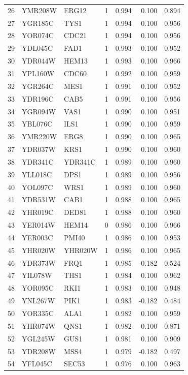 \begin{longtable}{rllrrrr}
26 & YMR208W & ERG12 & 1 & 0.994 & 0.100 & 0.894\\
27 & YGR185C & TYS1 & 1 & 0.994 & 0.100 & 0.956\\
28 & YOR074C & CDC21 & 1 & 0.994 & 0.100 & 0.956\\
29 & YDL045C & FAD1 & 1 & 0.993 & 0.100 & 0.952\\
30 & YDR044W & HEM13 & 1 & 0.993 & 0.100 & 0.966\\
31 & YPL160W & CDC60 & 1 & 0.992 & 0.100 & 0.959\\
32 & YGR264C & MES1 & 1 & 0.991 & 0.100 & 0.952\\
33 & YDR196C & CAB5 & 1 & 0.991 & 0.100 & 0.956\\
34 & YGR094W & VAS1 & 1 & 0.990 & 0.100 & 0.951\\
35 & YBL076C & ILS1 & 1 & 0.990 & 0.100 & 0.959\\
36 & YMR220W & ERG8 & 1 & 0.990 & 0.100 & 0.965\\
37 & YDR037W & KRS1 & 1 & 0.990 & 0.100 & 0.960\\
38 & YDR341C & YDR341C & 1 & 0.989 & 0.100 & 0.960\\
39 & YLL018C & DPS1 & 1 & 0.989 & 0.100 & 0.956\\
40 & YOL097C & WRS1 & 1 & 0.989 & 0.100 & 0.960\\
41 & YDR531W & CAB1 & 1 & 0.988 & 0.100 & 0.965\\
42 & YHR019C & DED81 & 1 & 0.988 & 0.100 & 0.960\\
43 & YER014W & HEM14 & 0 & 0.986 & 0.100 & 0.966\\
44 & YER003C & PMI40 & 1 & 0.986 & 0.100 & 0.953\\
45 & YHR020W & YHR020W & 1 & 0.986 & 0.100 & 0.965\\
46 & YDR373W & FRQ1 & 1 & 0.985 & -0.182 & 0.524\\
47 & YIL078W & THS1 & 1 & 0.984 & 0.100 & 0.962\\
48 & YOR095C & RKI1 & 1 & 0.983 & 0.100 & 0.948\\
49 & YNL267W & PIK1 & 1 & 0.983 & -0.182 & 0.484\\
50 & YOR335C & ALA1 & 1 & 0.982 & 0.100 & 0.959\\
51 & YHR074W & QNS1 & 1 & 0.982 & 0.100 & 0.871\\
52 & YGL245W & GUS1 & 1 & 0.981 & 0.100 & 0.909\\
53 & YDR208W & MSS4 & 1 & 0.979 & -0.182 & 0.497\\
54 & YFL045C & SEC53 & 1 & 0.976 & 0.100 & 0.963\\

\end{longtable}
